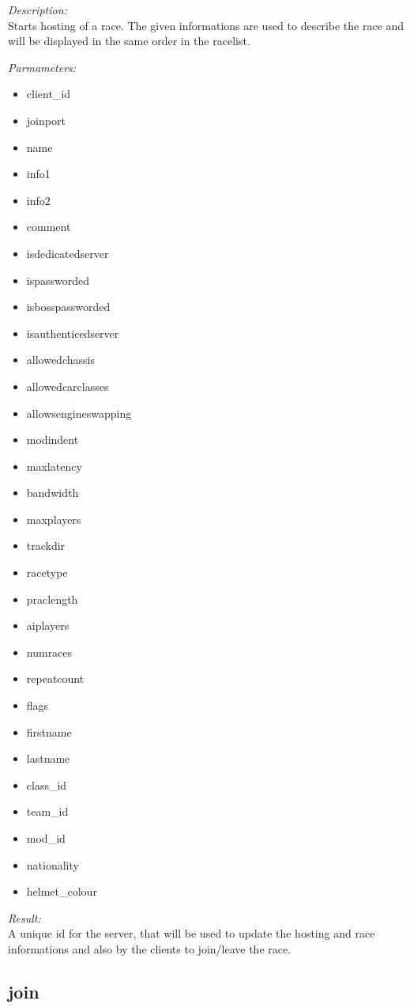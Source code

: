 \begin{description}
\item {\it Description:}\\
Starts hosting of a race. The given informations are used to describe the race and will be displayed in the same order in the racelist.
\item {\it Parmameters:}
\begin{itemize}
\item client\_id
\item joinport
\item name
\item info1
\item info2
\item comment
\item isdedicatedserver
\item ispassworded
\item isbosspassworded
\item isauthenticedserver
\item allowedchassis
\item allowedcarclasses
\item allowsengineswapping
\item modindent
\item maxlatency
\item bandwidth
\item maxplayers
\item trackdir
\item racetype
\item praclength
\item aiplayers
\item numraces
\item repeatcount
\item flags
\item firstname
\item lastname
\item class\_id
\item team\_id
\item mod\_id
\item nationality
\item helmet\_colour
\end{itemize}
\item {\it Result:}\\
A unique id for the server, that will be used to update the hosting and race informations and also by the clients to join/leave the race.
\end{description}

\subsection{join}

